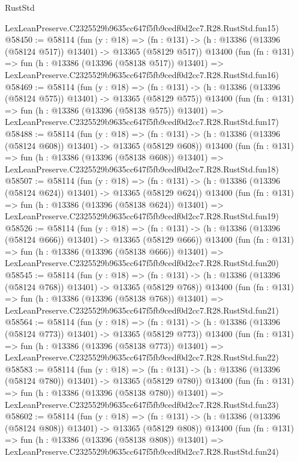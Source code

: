 \begin{lexlean}{RustStd}
\begin{coremodule}
    LexLeanPreserve.C2325529b9635cc647f5fb9cedf0d2cc7.R28.RustStd.fun15)
@58450 := @58114
    (fun (y : @18) =>
    (fn : @131) -> (h : @13386 (@13396 (@58124 @517)) @13401) -> @13365 (@58129 @517))
    @13400
    (fun (fn : @131) =>
    fun (h : @13386 (@13396 (@58138 @517)) @13401) =>
    LexLeanPreserve.C2325529b9635cc647f5fb9cedf0d2cc7.R28.RustStd.fun16)
@58469 := @58114
    (fun (y : @18) =>
    (fn : @131) -> (h : @13386 (@13396 (@58124 @575)) @13401) -> @13365 (@58129 @575))
    @13400
    (fun (fn : @131) =>
    fun (h : @13386 (@13396 (@58138 @575)) @13401) =>
    LexLeanPreserve.C2325529b9635cc647f5fb9cedf0d2cc7.R28.RustStd.fun17)
@58488 := @58114
    (fun (y : @18) =>
    (fn : @131) -> (h : @13386 (@13396 (@58124 @608)) @13401) -> @13365 (@58129 @608))
    @13400
    (fun (fn : @131) =>
    fun (h : @13386 (@13396 (@58138 @608)) @13401) =>
    LexLeanPreserve.C2325529b9635cc647f5fb9cedf0d2cc7.R28.RustStd.fun18)
@58507 := @58114
    (fun (y : @18) =>
    (fn : @131) -> (h : @13386 (@13396 (@58124 @624)) @13401) -> @13365 (@58129 @624))
    @13400
    (fun (fn : @131) =>
    fun (h : @13386 (@13396 (@58138 @624)) @13401) =>
    LexLeanPreserve.C2325529b9635cc647f5fb9cedf0d2cc7.R28.RustStd.fun19)
@58526 := @58114
    (fun (y : @18) =>
    (fn : @131) -> (h : @13386 (@13396 (@58124 @666)) @13401) -> @13365 (@58129 @666))
    @13400
    (fun (fn : @131) =>
    fun (h : @13386 (@13396 (@58138 @666)) @13401) =>
    LexLeanPreserve.C2325529b9635cc647f5fb9cedf0d2cc7.R28.RustStd.fun20)
@58545 := @58114
    (fun (y : @18) =>
    (fn : @131) -> (h : @13386 (@13396 (@58124 @768)) @13401) -> @13365 (@58129 @768))
    @13400
    (fun (fn : @131) =>
    fun (h : @13386 (@13396 (@58138 @768)) @13401) =>
    LexLeanPreserve.C2325529b9635cc647f5fb9cedf0d2cc7.R28.RustStd.fun21)
@58564 := @58114
    (fun (y : @18) =>
    (fn : @131) -> (h : @13386 (@13396 (@58124 @773)) @13401) -> @13365 (@58129 @773))
    @13400
    (fun (fn : @131) =>
    fun (h : @13386 (@13396 (@58138 @773)) @13401) =>
    LexLeanPreserve.C2325529b9635cc647f5fb9cedf0d2cc7.R28.RustStd.fun22)
@58583 := @58114
    (fun (y : @18) =>
    (fn : @131) -> (h : @13386 (@13396 (@58124 @780)) @13401) -> @13365 (@58129 @780))
    @13400
    (fun (fn : @131) =>
    fun (h : @13386 (@13396 (@58138 @780)) @13401) =>
    LexLeanPreserve.C2325529b9635cc647f5fb9cedf0d2cc7.R28.RustStd.fun23)
@58602 := @58114
    (fun (y : @18) =>
    (fn : @131) -> (h : @13386 (@13396 (@58124 @808)) @13401) -> @13365 (@58129 @808))
    @13400
    (fun (fn : @131) =>
    fun (h : @13386 (@13396 (@58138 @808)) @13401) =>
    LexLeanPreserve.C2325529b9635cc647f5fb9cedf0d2cc7.R28.RustStd.fun24)

\end{coremodule}
\end{lexlean}
